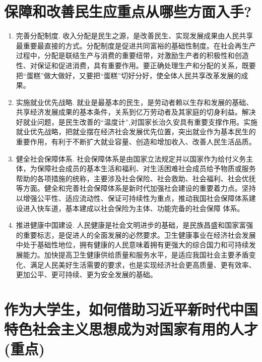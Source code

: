 \documentclass[12pt, a4paper, oneside]{ctexbook}
\begin{document}
\section{保障和改善民生应重点从哪些方面入手?}

\begin{enumerate}
\item 完善分配制度.
收入分配是民生之源，是改善民生、实现发展成果由人民共享最重要最直接的方式。分配制度是促进共同富裕的基础性制度。在社会再生产过程中，分配是联结生产与消费的重要纽带，对激励生产者的积极性和创造性、对保证和促进消费，具有重要作用。要正确处理生产和分配的关系，既要把“蛋糕”做大做好，又要把“蛋糕”切好分好，使全体人民共享改革发展的成果。

\item 实施就业优先战略.
就业是最基本的民生，是劳动者赖以生存和发展的基础、共享经济发展成果的基本条件，关系到亿万劳动者及其家庭的切身利益。解决好就业问题，是民生改善的“温度计”,对国家长治久安具有重要支撑作用。实施就业优先战略，把就业摆在经济社会发展优先位置，突出就业作为基本民生的重要作用，有利于不断扩大就业容量、创造和增加收入、改善人民生活品质。

\item 健全社会保障体系.
社会保障体系是由国家立法规定并以国家作为给付义务主体，为保障社会成员的基本生活和福利、对生活困难社会成员给予物质或服务帮助的各项措施的统称，主要涉及社会保险、社会救助、社会福利、社会优抚等方面。健全和完善社会保障体系是新时代加强社会建设的重要着力点。坚持以增强公平性、适应流动性、保证可持续性为重点，推动我国社会保障体系建设进入快车道，基本建成以社会保险为主体、功能完备的社会保障
体系。

\item 推进健康中国建设.
人民健康是社会文明进步的基础，是民族昌盛和国家富强的重要标志，是促进人的全面发展的必然要求。卫生健康事业在经济社会发展中处于基础性地位，拥有健康的人民意味着拥有更强大的综合国力和可持续发展能力。加快提高卫生健康供给质量和服务水平，是适应我国社会主要矛盾变化、满足人民美好生活需要的要求，也是实现经济社会更高质量、更有效率、更加公平、更可持续、更为安全发展的基础。
\end{enumerate}

\section{作为大学生，如何借助习近平新时代中国特色社会主义思想成为对国家有用的人才(重点)}
\end{document}
